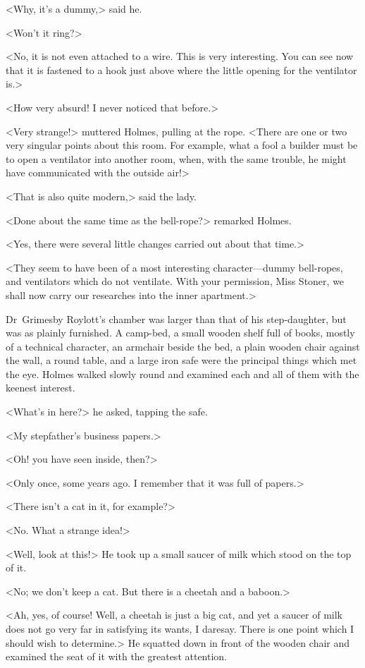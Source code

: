 <Why, it's a dummy,> said he.

<Won't it ring?>

<No, it is not even attached to a wire. This is very interesting. You can see now that it is fastened to a hook just above where the little opening for the ventilator is.>

<How very absurd! I never noticed that before.>

<Very strange!> muttered Holmes, pulling at the rope. <There are one or two very singular points about this room. For example, what a fool a builder must be to open a ventilator into another room, when, with the same trouble, he might have communicated with the outside air!>

<That is also quite modern,> said the lady.

<Done about the same time as the bell-rope?> remarked Holmes.

<Yes, there were several little changes carried out about that time.>

<They seem to have been of a most interesting character—dummy bell-ropes, and ventilators which do not ventilate. With your permission, Miss Stoner, we shall now carry our researches into the inner apartment.>

Dr~Grimesby Roylott's chamber was larger than that of his step-daughter, but was as plainly furnished. A camp-bed, a small wooden shelf full of books, mostly of a technical character, an armchair beside the bed, a plain wooden chair against the wall, a round table, and a large iron safe were the principal things which met the eye. Holmes walked slowly round and examined each and all of them with the keenest interest.

<What's in here?> he asked, tapping the safe.

<My stepfather's business papers.>

<Oh! you have seen inside, then?>

<Only once, some years ago. I remember that it was full of papers.>

<There isn't a cat in it, for example?>

<No. What a strange idea!>

<Well, look at this!> He took up a small saucer of milk which stood on the top of it.

<No; we don't keep a cat. But there is a cheetah and a baboon.>

<Ah, yes, of course! Well, a cheetah is just a big cat, and yet a saucer of milk does not go very far in satisfying its wants, I daresay. There is one point which I should wish to determine.> He squatted down in front of the wooden chair and examined the seat of it with the greatest attention.

